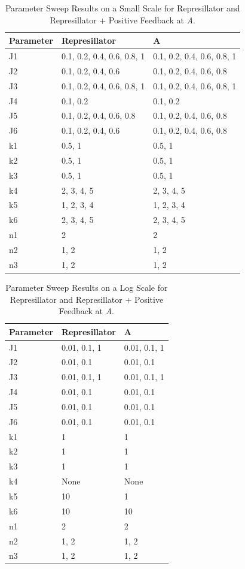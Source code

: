 \documentclass{article}
\begin{document}
\begin{table}[H]
\centering
\begin{tabular}{|l|l|l|}
\hline
\textbf{Parameter} & \textbf{Represillator} & \textbf{A} \\
\hline
J1 & 0.1, 0.2, 0.4, 0.6, 0.8, 1 & 0.1, 0.2, 0.4, 0.6, 0.8, 1 \\
J2 & 0.1, 0.2, 0.4, 0.6 & 0.1, 0.2, 0.4, 0.6, 0.8 \\
J3 & 0.1, 0.2, 0.4, 0.6, 0.8, 1 & 0.1, 0.2, 0.4, 0.6, 0.8, 1 \\
J4 & 0.1, 0.2 & 0.1, 0.2 \\
J5 & 0.1, 0.2, 0.4, 0.6, 0.8 & 0.1, 0.2, 0.4, 0.6, 0.8 \\
J6 & 0.1, 0.2, 0.4, 0.6 & 0.1, 0.2, 0.4, 0.6, 0.8 \\
k1 & 0.5, 1 & 0.5, 1 \\
k2 & 0.5, 1 & 0.5, 1 \\
k3 & 0.5, 1 & 0.5, 1 \\
k4 & 2, 3, 4, 5 & 2, 3, 4, 5 \\
k5 & 1, 2, 3, 4 & 1, 2, 3, 4 \\
k6 & 2, 3, 4, 5 & 2, 3, 4, 5 \\
n1 & 2 & 2 \\
n2 & 1, 2 & 1, 2 \\
n3 & 1, 2 & 1, 2 \\
\hline
\end{tabular}
\caption{Parameter Sweep Results on a Small Scale for Represillator and Represillator + Positive Feedback at \textit{A}.}
\end{table}




\begin{table}[H]
\centering
\begin{tabular}{|l|l|l|}
\hline
\textbf{Parameter} & \textbf{Represillator} & \textbf{A} \\
\hline
J1 & 0.01, 0.1, 1 & 0.01, 0.1, 1 \\
J2 & 0.01, 0.1 & 0.01, 0.1 \\
J3 & 0.01, 0.1, 1 & 0.01, 0.1, 1 \\
J4 & 0.01, 0.1 & 0.01, 0.1 \\
J5 & 0.01, 0.1 & 0.01, 0.1 \\
J6 & 0.01, 0.1 & 0.01, 0.1 \\
k1 & 1 & 1 \\
k2 & 1 & 1 \\
k3 & 1 & 1 \\
k4 & None & None \\
k5 & 10 & 1 \\
k6 & 10 & 10 \\
n1 & 2 & 2 \\
n2 & 1, 2 & 1, 2 \\
n3 & 1, 2 & 1, 2 \\
\hline
\end{tabular}
\caption{Parameter Sweep Results on a Log Scale for Represillator and Represillator + Positive Feedback at \textit{A}.}
\end{table}
\end{document}
